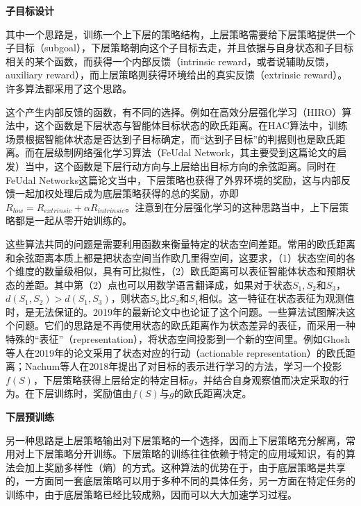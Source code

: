 \textbf{子目标设计}

其中一个思路是，训练一个上下层的策略结构，上层策略需要给下层策略提供一个子目标（subgoal），下层策略朝向这个子目标去走，并且依据与自身状态和子目标相关的某个函数，而获得一个内部反馈（intrinsic reward，或者说辅助反馈，auxiliary reward），而上层策略则获得环境给出的真实反馈（extrinsic reward）。许多算法都采用了这个思路\cite{Sutton:1999, Tenenbaum2016NIPS, HIRO, HAC, feudal}。

这个产生内部反馈的函数，有不同的选择。例如在高效分层强化学习（HIRO\cite{HIRO}）算法中，这个函数是下层状态与智能体目标状态的欧氏距离。在HAC\cite{HAC}算法中，训练场景根据智能体状态是否达到子目标确定，而``达到子目标''的判据则也是欧氏距离。而在层级制网络强化学习算法（FeUdal Network\cite{feudal}，其主要受到\cite{FUN}这篇论文的启发）当中，这个函数是下层行动方向与上层给出目标方向的余弦距离。同时在FeUdal Networks这篇论文当中，下层策略也获得了外界环境的奖励，这与内部反馈一起加权处理后成为底层策略获得的总的奖励，亦即$R_{low} = R_{extrinsic} + \alpha R_{intrinsic}$。注意到在分层强化学习的这种思路当中，上下层策略都是一起从零开始训练的。

这些算法共同的问题是需要利用函数来衡量特定的状态空间差距。常用的欧氏距离和余弦距离本质上都是把状态空间当作欧几里得空间，这要求，（1）状态空间的各个维度的数量级相似，具有可比拟性，（2）欧氏距离可以表征智能体状态和预期状态的差距。其中第（2）点也可以用数学语言翻译成，如果对于状态$S_1, S_2$和$S_3$，$d(S_1, S_2) > d(S_1, S_3)$，则状态$S_3$比$S_2$和$S_1$相似。这一特征在状态表征为观测值时，是无法保证的。2019年的最新论文\cite{goal-conditioned}中也论证了这个问题。一些算法试图解决这个问题。它们的思路是不再使用状态的欧氏距离作为状态差异的表征，而采用一种特殊的``表征''（representation），将状态空间投影到一个新的空间里。例如Ghosh等人在2019年的论文\cite{goal-conditioned}采用了状态对应的行动（actionable representation）的欧氏距离；Nachum等人在2018年\cite{goal_repr_learning}提出了对目标的表示进行学习的方法，学习一个投影$f(S)$，下层策略获得上层给定的特定目标$g$，并结合自身观察值而决定采取的行为。在下层训练时，奖励值由$f(S)$与$g$的欧氏距离决定。

\textbf{下层预训练}

另一种思路是上层策略输出对下层策略的一个选择，因而上下层策略充分解离，常用对上下层策略分开训练\cite{DIYAN, SNN4hrl, Learning_and_Transfer_of_Modulated_Locomotor_Controllers}。下层策略的训练往往依赖于特定的应用域知识，有的算法会加上奖励多样性（熵）的方式。这种算法的优势在于，由于底层策略是共享的，一方面同一套底层策略可以用于多种不同的具体任务，另一方面在特定任务的训练中，由于底层策略已经比较成熟，因而可以大大加速学习过程。

